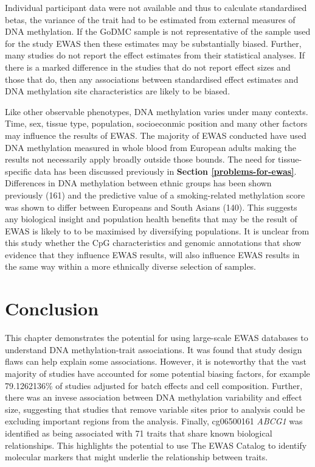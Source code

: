 \documentclass[11pt,oneside]{bristolthesis}
\begin{document}
Individual participant data were not available and thus to calculate standardised betas, the variance of the trait had to be estimated from external measures of DNA methylation. If the GoDMC sample is not representative of the sample used for the study EWAS then these estimates may be substantially biased. Further, many studies do not report the effect estimates from their statistical analyses. If there is a marked difference in the studies that do not report effect sizes and those that do, then any associations between standardised effect estimates and DNA methylation site characteristics are likely to be biased.

Like other observable phenotypes, DNA methylation varies under many contexts. Time, sex, tissue type, population, socioeconmic position and many other factors may influence the results of EWAS. The majority of EWAS conducted have used DNA methylation measured in whole blood from European adults making the results not necessarily apply broadly outside those bounds. The need for tissue-specific data has been discussed previously in \textbf{Section \ref{problems-for-ewas}}. Differences in DNA methylation between ethnic groups has been shown previously (161) and the predictive value of a smoking-related methylation score was shown to differ between Europeans and South Asians (140). This suggests any biological insight and population health benefits that may be the result of EWAS is likely to to be maximised by diversifying populations. It is unclear from this study whether the CpG characteristics and genomic annotations that show evidence that they influence EWAS results, will also influence EWAS results in the same way within a more ethnically diverse selection of samples.

\hypertarget{conclusion-04}{%
\section{Conclusion}\label{conclusion-04}}

This chapter demonstrates the potential for using large-scale EWAS databases to understand DNA methylation-trait associations. It was found that study design flaws can help explain some associations. However, it is noteworthy that the vast majority of studies have accounted for some potential biasing factors, for example 79.1262136\% of studies adjusted for batch effects and cell composition. Further, there was an invese association between DNA methylation variability and effect size, suggesting that studies that remove variable sites prior to analysis could be excluding important regions from the analysis. Finally, cg06500161 \emph{ABCG1} was identified as being associated with 71 traits that share known biological relationships. This highlights the potential to use The EWAS Catalog to identify molecular markers that might underlie the relationship between traits.
\end{document}
